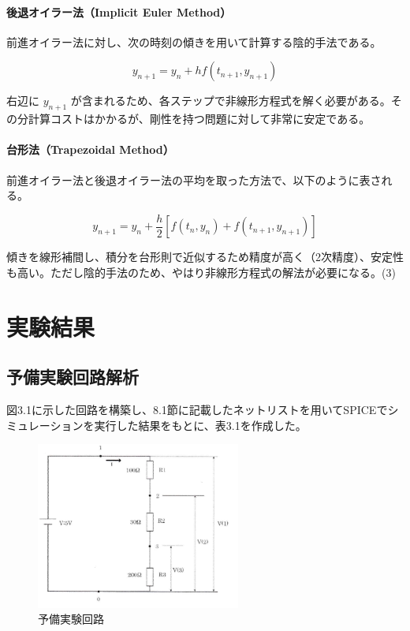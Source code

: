 \documentclass{jlreq}
\numberwithin{equation}{section}
\begin{document}
\paragraph{後退オイラー法（Implicit Euler Method）}
前進オイラー法に対し、次の時刻の傾きを用いて計算する陰的手法である。

\[
y_{n+1} = y_n + h f(t_{n+1}, y_{n+1})
\]

右辺に \( y_{n+1} \) が含まれるため、各ステップで非線形方程式を解く必要がある。その分計算コストはかかるが、剛性を持つ問題に対して非常に安定である。\\

\paragraph{台形法（Trapezoidal Method）}

前進オイラー法と後退オイラー法の平均を取った方法で、以下のように表される。

\[
y_{n+1} = y_n + \frac{h}{2} \left[ f(t_n, y_n) + f(t_{n+1}, y_{n+1}) \right]
\]

傾きを線形補間し、積分を台形則で近似するため精度が高く（2次精度）、安定性も高い。ただし陰的手法のため、やはり非線形方程式の解法が必要になる。(3)

\section{実験結果}
\subsection{予備実験回路解析}
図3.1に示した回路を構築し、8.1節に記載したネットリストを用いてSPICEでシミュレーションを実行した結果をもとに、表3.1を作成した。

\begin{figure}[H]
  \centering
  \includegraphics[width=0.6\textwidth]{assets/yobiex.png}
  \caption{予備実験回路}
\end{figure}
\end{document}
